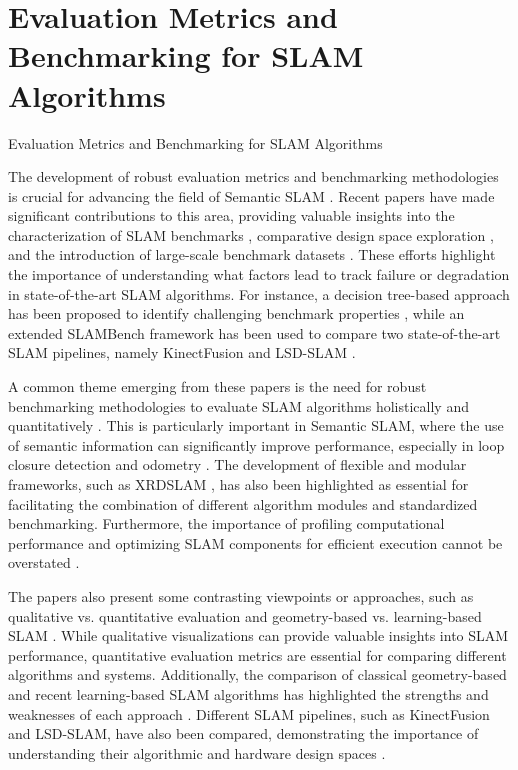 \documentclass[conference]{IEEEtran}
\begin{document}
\section{Evaluation Metrics and Benchmarking for SLAM Algorithms}
Evaluation Metrics and Benchmarking for SLAM Algorithms

The development of robust evaluation metrics and benchmarking methodologies is crucial for advancing the field of Semantic SLAM \cite{b1}. Recent papers have made significant contributions to this area, providing valuable insights into the characterization of SLAM benchmarks \cite{b2}, comparative design space exploration \cite{b3}, and the introduction of large-scale benchmark datasets \cite{b4}. These efforts highlight the importance of understanding what factors lead to track failure or degradation in state-of-the-art SLAM algorithms. For instance, a decision tree-based approach has been proposed to identify challenging benchmark properties \cite{b2}, while an extended SLAMBench framework has been used to compare two state-of-the-art SLAM pipelines, namely KinectFusion and LSD-SLAM \cite{b3}.

A common theme emerging from these papers is the need for robust benchmarking methodologies to evaluate SLAM algorithms holistically and quantitatively \cite{b1}. This is particularly important in Semantic SLAM, where the use of semantic information can significantly improve performance, especially in loop closure detection and odometry \cite{b5}. The development of flexible and modular frameworks, such as XRDSLAM \cite{b6}, has also been highlighted as essential for facilitating the combination of different algorithm modules and standardized benchmarking. Furthermore, the importance of profiling computational performance and optimizing SLAM components for efficient execution cannot be overstated \cite{b7}.

The papers also present some contrasting viewpoints or approaches, such as qualitative vs. quantitative evaluation \cite{b8} and geometry-based vs. learning-based SLAM \cite{b9}. While qualitative visualizations can provide valuable insights into SLAM performance, quantitative evaluation metrics are essential for comparing different algorithms and systems. Additionally, the comparison of classical geometry-based and recent learning-based SLAM algorithms has highlighted the strengths and weaknesses of each approach \cite{b9}. Different SLAM pipelines, such as KinectFusion and LSD-SLAM, have also been compared, demonstrating the importance of understanding their algorithmic and hardware design spaces \cite{b3}.
\end{document}
